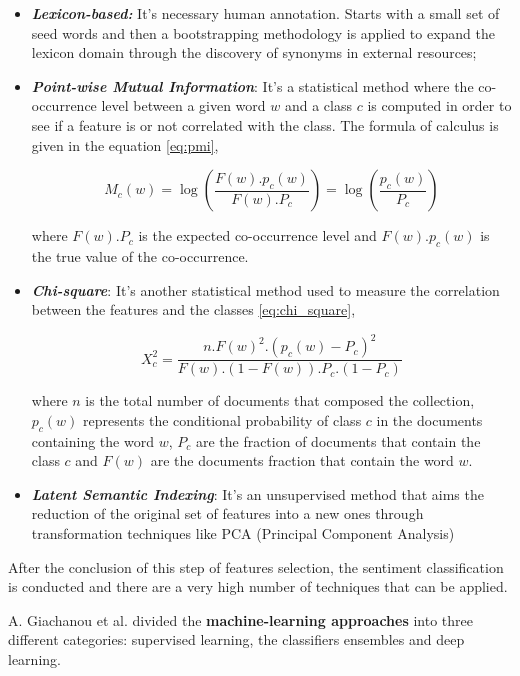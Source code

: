 \begin{itemize}
\item \textbf{\textit{Lexicon-based:}} It's necessary human annotation. Starts with a small set of seed words and then a bootstrapping methodology is applied to expand the lexicon domain through the discovery of synonyms in external resources;
\item \textbf{\textit{Point-wise Mutual Information}}: It's a statistical method where the co-occurrence level between a given word $w$ and a class $c$ is computed in order to see if a feature is or not correlated with the class. The formula of calculus is given in the equation \ref{eq:pmi},

\begin{equation} \label{eq:pmi}
 M_c(w) = \log(\frac{F(w).p_c(w)}{F(w).P_c}) = \log(\frac{p_c(w)}{P_c})
\end{equation}

where $F(w).P_c$ is the expected co-occurrence level and $F(w).p_c(w)$ is the true value of the co-occurrence.

\item \textbf{\textit{Chi-square}}: It's another statistical method used to measure the correlation between the features and the classes \ref{eq:chi_square},

\begin{equation} \label{eq:chi_square}
X_c^2 = \frac{n.F(w)^2.(p_c(w)-P_c)^2}{F(w).(1-F(w)).P_c.(1-P_c)}
\end{equation}

where $n$ is the total number of documents that composed the collection, $p_c(w)$ represents the conditional probability of class $c$ in the documents containing the word $w$, $P_c$ are the fraction of documents that contain the class $c$ and $F(w)$ are the documents fraction that contain the word $w$.

\item \textbf{\textit{Latent Semantic Indexing}}: It's an unsupervised method that aims the reduction of the original set of features into a new ones through transformation techniques like PCA (Principal Component Analysis)
\end{itemize}

After the conclusion of this step of features selection, the sentiment classification is conducted and there are a very high number of techniques that can be applied.

A. Giachanou et al. \cite{kn:Giachanou2016} divided the \textbf{machine-learning approaches} into three different categories: supervised learning, the classifiers ensembles and deep learning.

